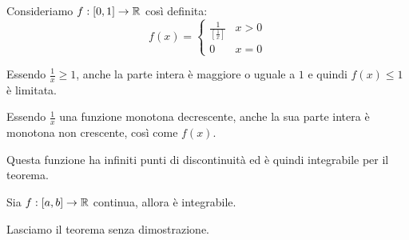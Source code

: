 \begin{example}
Consideriamo $f:[0,1] \to \mathbb R$ così definita:
\begin{equation*}
f(x) = \begin{cases}
\frac{1}{[\frac{1}{x}]} & x > 0 \\
0 & x = 0
\end{cases}
\end{equation*}

Essendo $\frac{1}{x} \ge 1$, anche la parte intera è maggiore o uguale a $1$ e quindi $f(x) \le 1$ è limitata.

Essendo $\frac{1}{x}$ una funzione monotona decrescente, anche la sua parte intera è monotona non crescente, così come $f(x)$.

Questa funzione ha infiniti punti di discontinuità ed è quindi integrabile per il teorema.
\end{example}

\begin{theorem}
Sia $f:[a,b] \to \mathbb R$ continua, allora è integrabile.
\end{theorem}

Lasciamo il teorema senza dimostrazione.
